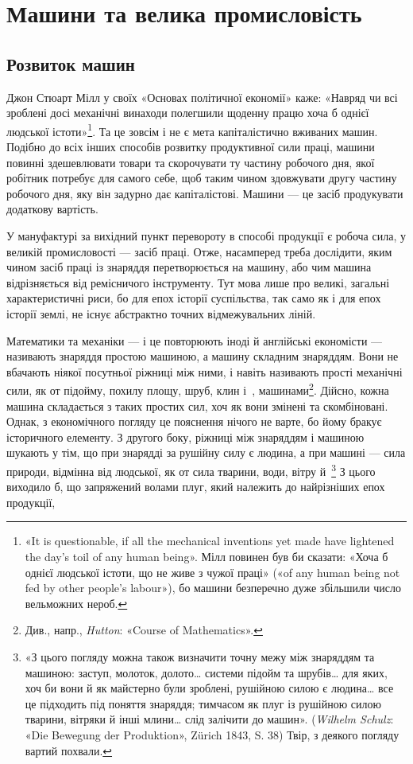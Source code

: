
\section{Машини та велика промисловість}
\subsection{Розвиток машин}

Джон Стюарт Мілл у своїх «Основах політичної економії»
каже: «Навряд чи всі зроблені досі механічні винаходи полегшили
щоденну працю хоча б однієї людської істоти»\footnote{
«It is questionable, if all the mechanical inventions yet made have
lightened the day’s toil of any human being». Мілл повинен був би сказати:
«Хоча б однієї людської істоти, що не живе з чужої праці» («of any human
being not fed by other people’s labour»), бо машини безперечно дуже збільшили
число вельможних нероб.
}. Та це зовсім і не є мета капіталістично вживаних машин. Подібно до
всіх інших способів розвитку продуктивної сили праці, машини
повинні здешевлювати товари та скорочувати ту частину робочого
дня, якої робітник потребує для самого себе, щоб таким
чином здовжувати другу частину робочого дня, яку він задурно
дає капіталістові. Машини — це засіб продукувати додаткову
вартість.

У мануфактурі за вихідний пункт перевороту в способі продукції
є робоча сила, у великій промисловості — засіб праці.
Отже, насамперед треба дослідити, яким чином засіб праці із
знаряддя перетворюється на машину, або чим машина відрізняється
від ремісничого інструменту. Тут мова лише про великі,
загальні характеристичні риси, бо для епох історії суспільства,
так само як і для епох історії землі, не існує абстрактно точних
відмежувальних ліній.

Математики та механіки — і це повторюють іноді й англійські
економісти — називають знаряддя простою машиною, а машину
складним знаряддям. Вони не вбачають ніякої посутньої
ріжниці між ними, і навіть називають прості механічні сили,
як от підойму, похилу площу, шруб, клин і~, машинами\footnote{
Див., напр., \emph{Hutton}: «Course of Mathematics».
}. Дійсно, кожна машина складається з таких простих сил,
хоч як вони змінені та скомбіновані. Однак, з економічного погляду
це пояснення нічого не варте, бо йому бракує історичного
елементу. З другого боку, ріжниці між знаряддям і машиною
шукають у тім, що при знарядді за рушійну силу є людина, а
при машині — сила природи, відмінна від людської, як от сила
тварини, води, вітру й~\footnote{
«З цього погляду можна також визначити точну межу між знаряддям
та машиною: заступ, молоток, долото\dots{} системи підойм та шрубів\dots{}
для яких, хоч би вони й як майстерно були зроблені, рушійною силою є
людина\dots{} все це підходить під поняття знаряддя; тимчасом як плуг із
рушійною силою тварини, вітряки й інші млини\dots{} слід залічити до машин».
(\emph{Wilhelm Schulz}: «Die Bewegung der Produktion», Zürich 1843, S. 38)
Твір, з деякого погляду вартий похвали.
} З цього виходило б, що запряжений
волами плуг, який належить до найрізніших епох продукції,
\parbreak{}  %
